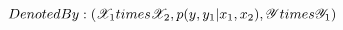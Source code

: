 \documentclass[preview]{standalone}
\begin{document}
\begin{center}
$Denoted By: (\mathscr{X}_1 \\times \mathscr{X}_2 ,p(y,y_1|x_1,x_2),\mathscr{Y} \\times \mathscr{Y}_1)$
\end{center}
\end{document}
